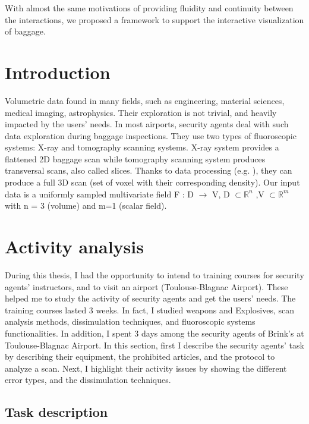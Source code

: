 With almost the same motivations of providing fluidity and continuity between the interactions, we proposed a framework to support the interactive visualization of baggage.

\section{Introduction}
Volumetric data found in many fields, such as engineering, material sciences, medical imaging, astrophysics. Their exploration is not trivial, and heavily impacted by the users' needs. In most airports, security agents deal with such data exploration during baggage inspections. They use two types of fluoroscopic systems: X-ray and tomography scanning systems. X-ray system provides a flattened 2D baggage scan while tomography scanning system produces transversal scans, also called slices. 
Thanks to data processing (e.g. \cite{deans2007radon}), they can produce a full 3D scan (set of voxel with their corresponding density).
Our input data is a uniformly sampled multivariate field F : D $\longrightarrow$ V, D $\subset \mathbb{R}^{n}$ 
,V $\subset \mathbb{R}^{m}$ with n = 3 (volume) and m=1 (scalar field).



\section{Activity analysis}

During this thesis, I had the opportunity to intend to training courses for security agents' instructors, and to visit an airport (Toulouse-Blagnac Airport). These helped me to study the activity of security agents and get the users' needs. The training courses lasted 3 weeks. In fact, I studied weapons and Explosives, scan analysis methods, dissimulation techniques, and fluoroscopic systems functionalities. In addition, I spent 3 days among the security agents of Brink's at Toulouse-Blagnac Airport. In this section, first I describe the security agents' task by describing their equipment, the prohibited articles, and the protocol to analyze a scan. Next, I highlight their activity issues by showing the different error types, and the dissimulation techniques.

\subsection{Task description}

